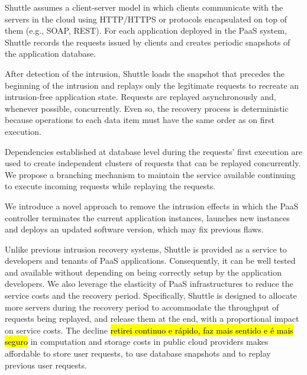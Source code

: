 Shuttle assumes a client-server model in which clients communicate with the servers in the cloud using \ac{HTTP}/\ac{HTTPS} or protocols encapsulated on top of them (e.g., \acs{SOAP}, \acs{REST}). For each application deployed in the \ac{PaaS} system, Shuttle records the requests issued by clients and creates periodic snapshots of the application database. 

After detection of the intrusion, Shuttle loads the snapshot that precedes the beginning of the intrusion and replays only the legitimate requests to recreate an intrusion-free application state. Requests are replayed asynchronously and, whenever possible, concurrently. Even so, the recovery process is deterministic because operations to each data item must have the same order as on first execution. 

Dependencies established at database level during the requests' first execution are used to create independent clusters of requests that can be replayed concurrently. We propose a branching mechanism to maintain the service available continuing to execute incoming requests while replaying the requests. 

We introduce a novel approach to remove the intrusion effects in which the \ac{PaaS} controller terminates the current application instances, launches new instances and deploys an updated software version, which may fix previous flaws.



Unlike previous intrusion recovery systems, Shuttle is provided as a service to developers and tenants of \ac{PaaS} applications. Consequently, it can be well tested and available without depending on being correctly setup by the application developers. We also leverage the elasticity of \ac{PaaS} infrastructures to reduce the service costs and the recovery period. Specifically, Shuttle is designed to allocate more servers during the recovery period to accommodate the throughput of requests being replayed, and release them at the end, with a proportional impact on service costs. The decline \hl{retirei continuo e rápido, faz mais sentido e é mais seguro} in computation and storage costs in public cloud providers makes affordable to store user requests, to use database snapshots and to replay previous user requests.

